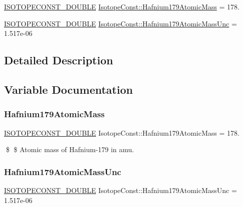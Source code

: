 \begin{DoxyCompactItemize}
\item 
\mbox{\hyperlink{group___isotope_const-_macros_ga8f45a7272ce02c0b4c65c44636ed719a}{I\+S\+O\+T\+O\+P\+E\+C\+O\+N\+S\+T\+\_\+\+D\+O\+U\+B\+LE}} \mbox{\hyperlink{group___isotope_const-_hafnium-_hf179_gaf25cc8d87f40a91315ba55b623a20f7e}{Isotope\+Const\+::\+Hafnium179\+Atomic\+Mass}} = 178.
\item 
\mbox{\hyperlink{group___isotope_const-_macros_ga8f45a7272ce02c0b4c65c44636ed719a}{I\+S\+O\+T\+O\+P\+E\+C\+O\+N\+S\+T\+\_\+\+D\+O\+U\+B\+LE}} \mbox{\hyperlink{group___isotope_const-_hafnium-_hf179_gaef79743499e2c7229baecd53e05f4223}{Isotope\+Const\+::\+Hafnium179\+Atomic\+Mass\+Unc}} = 1.\+517e-\/06
\end{DoxyCompactItemize}


\subsection{Detailed Description}


\subsection{Variable Documentation}
\mbox{\label{group___isotope_const-_hafnium-_hf179_gaf25cc8d87f40a91315ba55b623a20f7e}} 
\subsubsection{\texorpdfstring{Hafnium179\+Atomic\+Mass}{Hafnium179AtomicMass}}
{\footnotesize\ttfamily \mbox{\hyperlink{group___isotope_const-_macros_ga8f45a7272ce02c0b4c65c44636ed719a}{I\+S\+O\+T\+O\+P\+E\+C\+O\+N\+S\+T\+\_\+\+D\+O\+U\+B\+LE}} Isotope\+Const\+::\+Hafnium179\+Atomic\+Mass = 178.}

\$ \$ Atomic mass of Hafnium-\/179 in amu. \mbox{\label{group___isotope_const-_hafnium-_hf179_gaef79743499e2c7229baecd53e05f4223}} 
\subsubsection{\texorpdfstring{Hafnium179\+Atomic\+Mass\+Unc}{Hafnium179AtomicMassUnc}}
{\footnotesize\ttfamily \mbox{\hyperlink{group___isotope_const-_macros_ga8f45a7272ce02c0b4c65c44636ed719a}{I\+S\+O\+T\+O\+P\+E\+C\+O\+N\+S\+T\+\_\+\+D\+O\+U\+B\+LE}} Isotope\+Const\+::\+Hafnium179\+Atomic\+Mass\+Unc = 1.\+517e-\/06}

